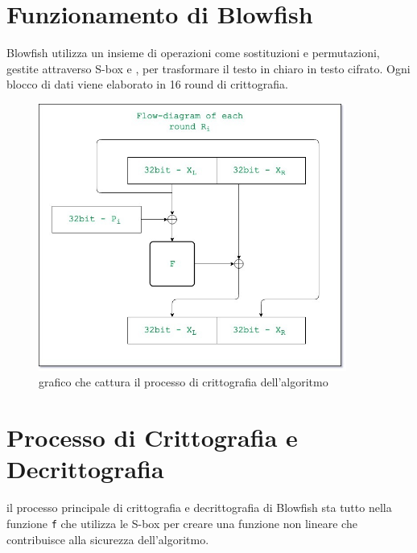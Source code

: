 \documentclass[a4paper,12pt]{report}
\begin{document}
	\section{Funzionamento di Blowfish}

	Blowfish utilizza un insieme di operazioni come sostituzioni e permutazioni,
	gestite attraverso S-box e , per trasformare il testo in chiaro in
	testo cifrato. Ogni blocco di dati viene elaborato in 16 round di
	crittografia.
	\begin{figure}[H]
		\centering
		\includegraphics[width=0.9\textwidth]{encription.jpg}
		\caption{grafico che cattura il processo di crittografia dell'algoritmo \cite{blowfish-algorithm}}
		\label{fig:encription}
	\end{figure}


	\section*{Processo di Crittografia e Decrittografia}
	il processo principale di crittografia e decrittografia di Blowfish sta tutto 
	nella funzione \texttt{f} che utilizza le S-box per creare una funzione non
	lineare che contribuisce alla sicurezza dell'algoritmo.
\end{document}
